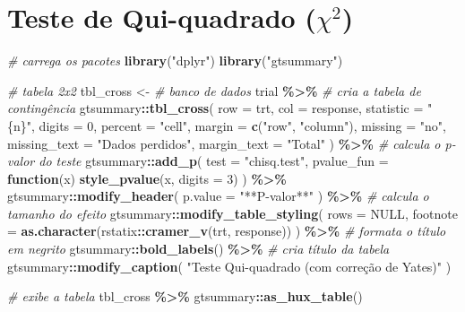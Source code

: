 \documentclass[
  a4paper,
]{book}
\newenvironment{Shaded}{\begin{snugshade}}{\end{snugshade}}
\newcommand{\AttributeTok}[1]{\textcolor[rgb]{0.13,0.29,0.53}{#1}}
\newcommand{\CommentTok}[1]{\textcolor[rgb]{0.56,0.35,0.01}{\textit{#1}}}
\newcommand{\ConstantTok}[1]{\textcolor[rgb]{0.56,0.35,0.01}{#1}}
\newcommand{\ControlFlowTok}[1]{\textcolor[rgb]{0.13,0.29,0.53}{\textbf{#1}}}
\newcommand{\DecValTok}[1]{\textcolor[rgb]{0.00,0.00,0.81}{#1}}
\newcommand{\FunctionTok}[1]{\textcolor[rgb]{0.13,0.29,0.53}{\textbf{#1}}}
\newcommand{\NormalTok}[1]{#1}
\newcommand{\OtherTok}[1]{\textcolor[rgb]{0.56,0.35,0.01}{#1}}
\newcommand{\SpecialCharTok}[1]{\textcolor[rgb]{0.81,0.36,0.00}{\textbf{#1}}}
\newcommand{\StringTok}[1]{\textcolor[rgb]{0.31,0.60,0.02}{#1}}
\begin{document}
\hypertarget{teste-de-qui-quadrado-chi2}{%
\section{\texorpdfstring{Teste de Qui-quadrado (\(\chi^2\))}{Teste de Qui-quadrado (\textbackslash chi\^{}2)}}\label{teste-de-qui-quadrado-chi2}}

\begin{Shaded}
\begin{Highlighting}[]
\CommentTok{\# carrega os pacotes}
\FunctionTok{library}\NormalTok{(}\StringTok{"dplyr"}\NormalTok{)}
\FunctionTok{library}\NormalTok{(}\StringTok{"gtsummary"}\NormalTok{)}

\CommentTok{\# tabela 2x2}
\NormalTok{tbl\_cross }\OtherTok{\textless{}{-}}
  \CommentTok{\# banco de dados}
\NormalTok{  trial }\SpecialCharTok{\%\textgreater{}\%}
  \CommentTok{\# cria a tabela de contingência}
\NormalTok{  gtsummary}\SpecialCharTok{::}\FunctionTok{tbl\_cross}\NormalTok{(}
    \AttributeTok{row =}\NormalTok{ trt,}
    \AttributeTok{col =}\NormalTok{ response,}
    \AttributeTok{statistic =} \StringTok{"\{n\}"}\NormalTok{,}
    \AttributeTok{digits =} \DecValTok{0}\NormalTok{,}
    \AttributeTok{percent =} \StringTok{"cell"}\NormalTok{,}
    \AttributeTok{margin =} \FunctionTok{c}\NormalTok{(}\StringTok{"row"}\NormalTok{, }\StringTok{"column"}\NormalTok{),}
    \AttributeTok{missing =} \StringTok{"no"}\NormalTok{,}
    \AttributeTok{missing\_text =} \StringTok{"Dados perdidos"}\NormalTok{,}
    \AttributeTok{margin\_text =} \StringTok{"Total"}
\NormalTok{  ) }\SpecialCharTok{\%\textgreater{}\%}
  \CommentTok{\# calcula o p{-}valor do teste}
\NormalTok{  gtsummary}\SpecialCharTok{::}\FunctionTok{add\_p}\NormalTok{(}
    \AttributeTok{test =} \StringTok{"chisq.test"}\NormalTok{,}
    \AttributeTok{pvalue\_fun =} \ControlFlowTok{function}\NormalTok{(x) }\FunctionTok{style\_pvalue}\NormalTok{(x, }\AttributeTok{digits =} \DecValTok{3}\NormalTok{)}
\NormalTok{  ) }\SpecialCharTok{\%\textgreater{}\%}
\NormalTok{  gtsummary}\SpecialCharTok{::}\FunctionTok{modify\_header}\NormalTok{(}
    \AttributeTok{p.value =} \StringTok{"**P{-}valor**"}
\NormalTok{  ) }\SpecialCharTok{\%\textgreater{}\%}
  \CommentTok{\# calcula o tamanho do efeito}
\NormalTok{  gtsummary}\SpecialCharTok{::}\FunctionTok{modify\_table\_styling}\NormalTok{(}
    \AttributeTok{rows =} \ConstantTok{NULL}\NormalTok{,}
    \AttributeTok{footnote =} \FunctionTok{as.character}\NormalTok{(rstatix}\SpecialCharTok{::}\FunctionTok{cramer\_v}\NormalTok{(trt, response))}
\NormalTok{  ) }\SpecialCharTok{\%\textgreater{}\%}
  \CommentTok{\# formata o título em negrito}
\NormalTok{  gtsummary}\SpecialCharTok{::}\FunctionTok{bold\_labels}\NormalTok{() }\SpecialCharTok{\%\textgreater{}\%}
  \CommentTok{\# cria título da tabela}
\NormalTok{  gtsummary}\SpecialCharTok{::}\FunctionTok{modify\_caption}\NormalTok{(}
    \StringTok{"Teste Qui{-}quadrado (com correção de Yates)"}
\NormalTok{  )}

\CommentTok{\# exibe a tabela}
\NormalTok{tbl\_cross }\SpecialCharTok{\%\textgreater{}\%}
\NormalTok{  gtsummary}\SpecialCharTok{::}\FunctionTok{as\_hux\_table}\NormalTok{()}
\end{Highlighting}
\end{Shaded}
\end{document}
